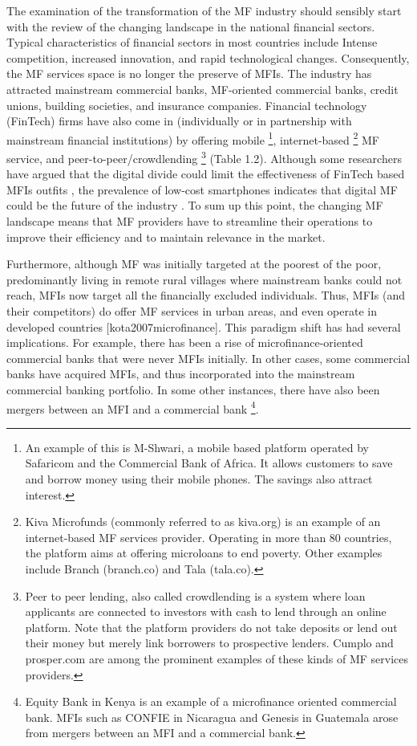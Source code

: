 \documentclass[a4paper, nobind]{templates/ociamthesis}
\begin{document}
The examination of the transformation of the MF industry should sensibly start with the review of the changing landscape in the national financial sectors. Typical characteristics of financial sectors in most countries include Intense competition, increased innovation, and rapid technological changes. Consequently, the MF services space is no longer the preserve of MFIs. The industry has attracted mainstream commercial banks, MF-oriented commercial banks, credit unions, building societies, and insurance companies. Financial technology (FinTech) firms have also come in (individually or in partnership with mainstream financial institutions) by offering mobile \footnote{An example of this is M-Shwari, a mobile based platform operated by Safaricom and the Commercial Bank of Africa. It allows customers to save and borrow money using their mobile phones. The savings also attract interest.}, internet-based \footnote{Kiva Microfunds (commonly referred to as kiva.org) is an example of an internet-based MF services provider. Operating in more than 80 countries, the platform aims at offering microloans to end poverty. Other examples include Branch (branch.co) and Tala (tala.co).} MF service, and peer-to-peer/crowdlending \footnote{Peer to peer lending, also called crowdlending is a system where loan applicants are connected to investors with cash to lend through an online platform. Note that the platform providers do not take deposits or lend out their money but merely link borrowers to prospective lenders. Cumplo and prosper.com are among the prominent examples of these kinds of MF services providers.} (Table 1.2). Although some researchers have argued that the digital divide could limit the effectiveness of FinTech based MFIs outfits \autocite{yartey2017subaltern,fd2017}, the prevalence of low-cost smartphones indicates that digital MF could be the future of the industry \autocite{yum2012wisdom}. To sum up this point, the changing MF landscape means that MF providers have to streamline their operations to improve their efficiency and to maintain relevance in the market.

Furthermore, although MF was initially targeted at the poorest of the poor, predominantly living in remote rural villages where mainstream banks could not reach, MFIs now target all the financially excluded individuals. Thus, MFIs (and their competitors) do offer MF services in urban areas, and even operate in developed countries {[}kota2007microfinance{]}. This paradigm shift has had several implications. For example, there has been a rise of microfinance-oriented commercial banks that were never MFIs initially. In other cases, some commercial banks have acquired MFIs, and thus incorporated into the mainstream commercial banking portfolio. In some other instances, there have also been mergers between an MFI and a commercial bank \footnote{Equity Bank in Kenya is an example of a microfinance oriented commercial bank. MFIs such as CONFIE in Nicaragua and Genesis in Guatemala arose from mergers between an MFI and a commercial bank.}.
\end{document}
